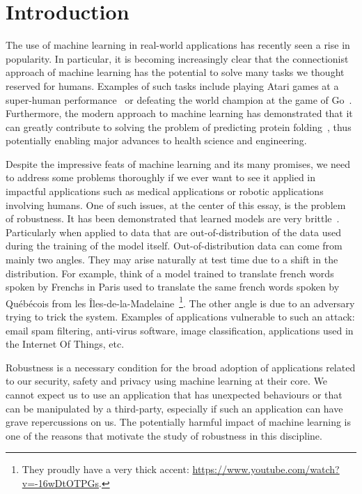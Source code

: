 \section{Introduction}

The use of machine learning in real-world applications has recently seen a rise in popularity. In particular, it is becoming increasingly clear that the connectionist approach of machine learning has the potential to solve many tasks we thought reserved for humans. Examples of such tasks include playing Atari games at a super-human performance~\cite{mnih_atari} or defeating the world champion at the game of Go~\cite{silver_go}. Furthermore, the modern approach to machine learning has demonstrated that it can greatly contribute to solving the problem of predicting protein folding~\cite{jumper_alphafold}, thus potentially enabling major advances to health science and engineering. 

Despite the impressive feats of machine learning and its many promises, we need to address some problems thoroughly if we ever want to see it applied in impactful applications such as medical applications or robotic applications involving humans. One of such issues, at the center of this essay, is the problem of robustness. It has been demonstrated that learned models are very brittle~\cite{goodfellow_explaining}. Particularly when applied to data that are out-of-distribution of the data used during the training of the model itself. Out-of-distribution data can come from mainly two angles. They may arise naturally at test time due to a shift in the distribution. 
For example, think of a model trained to translate french words spoken by Frenchs in Paris used to translate the same french words spoken by Québécois from les Îles-de-la-Madelaine~\footnote{They proudly have a very thick accent: \href{https://www.youtube.com/watch?v=-16wDtOTPGs}{https://www.youtube.com/watch?v=-16wDtOTPGs}.}.
The other angle is due to an adversary trying to trick the system. Examples of applications vulnerable to such an attack: email spam filtering, anti-virus software, image classification, applications used in the Internet Of Things, etc.

Robustness is a necessary condition for the broad adoption of applications related to our security, safety and privacy using machine learning at their core. We cannot expect us to use an application that has unexpected behaviours or that can be manipulated by a third-party, especially if such an application can have grave repercussions on us. The potentially harmful impact of machine learning is one of the reasons that motivate the study of robustness in this discipline.

